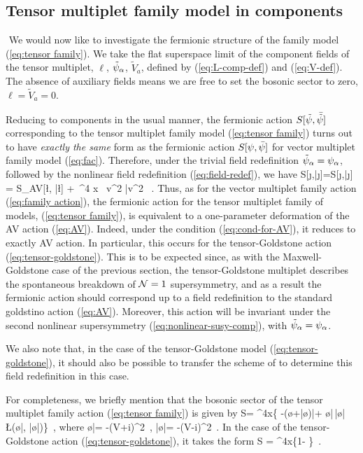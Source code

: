 \vskip0.5cm
\subsection{Tensor multiplet family model in components}
${}$\newline
\indent We would now like to investigate the fermionic structure of the family model (\ref{eq:tensor family}). We take the flat superspace limit of the component fields of the tensor multiplet, $\ell$, ${\tilde {\psi}}_\alpha$, ${\tilde V}_a$, defined by (\ref{eq:L-comp-def}) and (\ref{eq:V-def}). The absence of auxiliary fields means we are free to set the bosonic sector to zero, $\ell={\tilde V}_a=0$. 

Reducing to components in the usual manner, the fermionic action $S[{\tilde {\psi}},{\bar {\tilde {\psi}}}]$ corresponding to the tensor multiplet family model (\ref{eq:tensor family}) turns out to have {\it exactly the same} form as the fermionic action $S[\psi,{\bar {\psi}}]$ for vector multiplet family model (\ref{eq:fac}). Therefore, under the trivial field redefinition ${\tilde {\psi}}_\alpha=\psi_\alpha$, followed by the nonlinear field redefinition (\ref{eq:field-redef}), we have
\be
S[{\tilde \j},{\bar {\tilde \j}}]=S[\j,{\bar \j}]
= S_{\rm AV}[\l, {\bar \l}] + 
\,\m \int\!^4 x
\, \la v^2 \bar{v}^2 \ra~.
\ee
Thus, as for the vector multiplet family action (\ref{eq:family action}), the fermionic action for the tensor multiplet family of models, (\ref{eq:tensor family}), is equivalent to a one-parameter deformation of the AV action (\ref{eq:AV}). Indeed, under the condition (\ref{eq:cond-for-AV}), it reduces to exactly AV action. In particular, this occurs for the tensor-Goldstone action (\ref{eq:tensor-goldstone}). This is to be expected since, as with the Maxwell-Goldstone case of the previous section, the tensor-Goldstone multiplet describes the spontaneous breakdown of ${\cal N}=1$ supersymmetry, and as a result the fermionic action should correspond up to a field redefinition to the standard goldstino action (\ref{eq:AV}). Moreover,  this action will be invariant under the second nonlinear supersymmetry (\ref{eq:nonlinear-susy-comp}), with ${\tilde {\psi}}_\alpha=\psi_\alpha$.

We also note that, in the case of the tensor-Goldstone model (\ref{eq:tensor-goldstone}), it should also be possible to transfer the scheme of \cite{Hatanaka:2003cr} to determine this field redefinition in this case.

For completeness, we briefly mention that the bosonic sector of the tensor multiplet family action (\ref{eq:tensor family}) is given by
\be
S= \int\!^4x\left\{
-(\o+{\bar \o})|+
\o|\,{\bar \o}|\,
\L(\o|,
{\bar \o}|)\right\}~,
\ee
where
\be
\o|=
-({\tilde V}+{\rm i}\partial \ell)^{2}~,\quad\qquad
{\bar \o}|=
-({\tilde V}-{\rm i}\partial \ell)^{2}~.
\ee
In the case of the tensor-Goldstone action (\ref{eq:tensor-goldstone}), it takes the form
\be
\label{eq:D3-5D}
S = \int\!^4x\left\{1-
\right\}~.
\ee

